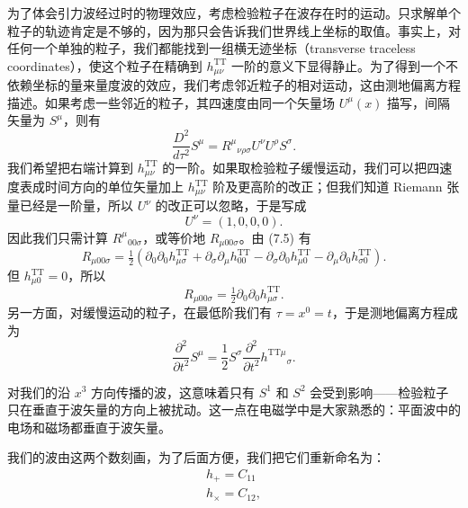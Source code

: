为了体会引力波经过时的物理效应，考虑检验粒子在波存在时的运动。只求解单个粒子的轨迹肯定是不够的，因为那只会告诉我们世界线上坐标的取值。事实上，对任何一个单独的粒子，我们都能找到一组横无迹坐标（transverse traceless coordinates），使这个粒子在精确到 $h^{\mathrm{TT}}_{\mu\nu}$ 一阶的意义下显得静止。为了得到一个不依赖坐标的量来量度波的效应，我们考虑邻近粒子的相对运动，这由测地偏离方程描述。如果考虑一些邻近的粒子，其四速度由同一个矢量场 $U^\mu(x)$ 描写，间隔矢量为 $S^\mu$，则有
\begin{equation*}
\frac{D^2}{d\tau^2}S^\mu = R^\mu{}_{\nu\rho\sigma}U^\nu U^\rho S^\sigma.
\tag{7.103}
\end{equation*}
我们希望把右端计算到 $h^{\mathrm{TT}}_{\mu\nu}$ 的一阶。如果取检验粒子缓慢运动，我们可以把四速度表成时间方向的单位矢量加上 $h^{\mathrm{TT}}_{\mu\nu}$ 阶及更高阶的改正；但我们知道 Riemann 张量已经是一阶量，所以 $U^\nu$ 的改正可以忽略，于是写成
\begin{equation*}
U^\nu = (1, 0, 0, 0).
\tag{7.104}
\end{equation*}
因此我们只需计算 $R^\mu{}_{00\sigma}$，或等价地 $R_{\mu 00\sigma}$。由 (7.5) 有
\begin{equation*}
R_{\mu 00\sigma} = \tfrac{1}{2}(\partial_0\partial_0 h^{\mathrm{TT}}_{\mu\sigma} + \partial_\sigma\partial_\mu h^{\mathrm{TT}}_{00} - \partial_\sigma\partial_0 h^{\mathrm{TT}}_{\mu 0} - \partial_\mu\partial_0 h^{\mathrm{TT}}_{\sigma 0}).
\tag{7.105}
\end{equation*}
但 $h^{\mathrm{TT}}_{\mu 0} = 0$，所以
\begin{equation*}
R_{\mu 00\sigma} = \tfrac{1}{2}\partial_0\partial_0 h^{\mathrm{TT}}_{\mu\sigma}.
\tag{7.106}
\end{equation*}
另一方面，对缓慢运动的粒子，在最低阶我们有 $\tau = x^0 = t$，于是测地偏离方程成为
\begin{equation*}
\frac{\partial^2}{\partial t^2}S^\mu = \frac{1}{2}S^\sigma\frac{\partial^2}{\partial t^2}h^{\mathrm{TT}\mu}{}_{\sigma}.
\tag{7.107}
\end{equation*}

对我们的沿 $x^3$ 方向传播的波，这意味着只有 $S^1$ 和 $S^2$ 会受到影响——检验粒子只在垂直于波矢量的方向上被扰动。这一点在电磁学中是大家熟悉的：平面波中的电场和磁场都垂直于波矢量。

我们的波由这两个数刻画，为了后面方便，我们把它们重新命名为：
\begin{gather*}
h_+ = C_{11} \\
h_\times = C_{12},
\tag{7.108}
\end{gather*}


